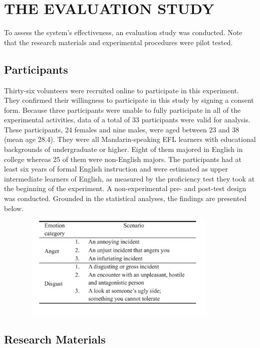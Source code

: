 \documentclass[a4paper,12pt,oneside]{article}
\begin{document}
\newpage
\section{THE EVALUATION STUDY}
To assess the system’s effectiveness, an evaluation study was conducted. Note that the research materials and experimental procedures were pilot tested. 

\subsection{Participants}

Thirty-six volunteers were recruited online to participate in this experiment. They confirmed their willingness to participate in this study by signing a consent form. Because three participants were unable to fully participate in all of the experimental activities, data of a total of 33 participants were valid for analysis. These participants, 24 females and nine males, were aged between 23 and 38 (mean age 28.4). They were all Mandarin-speaking EFL learners with educational backgrounds of undergraduate or higher. Eight of them majored in English in college whereas 25 of them were non-English majors. The participants had at least six years of formal English instruction and were estimated as upper intermediate learners of English, as measured by the proficiency test they took at the beginning of the experiment. A non-experimental pre- and post-test design was conducted. Grounded in the statistical analyses, the findings are presented below. 

\begin{figure}[H]
\includegraphics[height=5cm,width=10cm]{Table1.png}
\centering
\end{figure}

\subsection{Research Materials}
\end{document}
